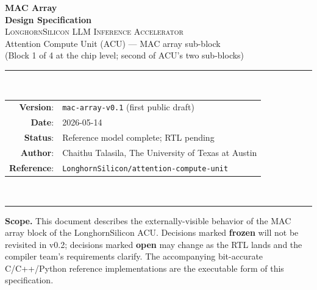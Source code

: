\documentclass[11pt]{article}
\begin{document}
\thispagestyle{empty}
\begin{center}
\vspace*{1.2in}
{\Huge\bfseries MAC Array}\\[0.4em]
{\LARGE\bfseries Design Specification}\\[1.2em]

{\large \textsc{LonghornSilicon LLM Inference Accelerator}}\\[0.4em]
{\large Attention Compute Unit (ACU) --- MAC array sub-block}\\[0.3em]
{\normalsize (Block 1 of 4 at the chip level; second of ACU's two sub-blocks)}\\[2em]

\rule{0.7\textwidth}{0.4pt}\\[1em]

\begin{tabular}{rl}
\textbf{Version}:    & \texttt{mac-array-v0.1} (first public draft) \\
\textbf{Date}:       & 2026-05-14 \\
\textbf{Status}:     & Reference model complete; RTL pending \\
\textbf{Author}:     & Chaithu Talasila, The University of Texas at Austin \\
\textbf{Reference}:  & \texttt{LonghornSilicon/attention-compute-unit} \\
\end{tabular}\\[1em]
\rule{0.7\textwidth}{0.4pt}

\vfill
\begin{minipage}{0.85\textwidth}
\small
\textbf{Scope.} This document describes the externally-visible behavior of
the MAC array block of the LonghornSilicon ACU. Decisions marked
\textbf{frozen} will not be revisited in v0.2; decisions marked
\textbf{open} may change as the RTL lands and the compiler team's
requirements clarify. The accompanying bit-accurate C/C++/Python
reference implementations are the executable form of this specification.
\end{minipage}

\vspace{0.3in}
\end{center}

\clearpage

\tableofcontents
\clearpage
\end{document}
